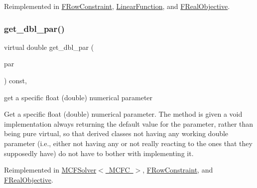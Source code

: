 Reimplemented in \mbox{\hyperlink{class_s_m_spp__di__unipi__it_1_1_f_row_constraint_af420d3dff49afbccc8a0c2de86374eeb}{F\+Row\+Constraint}}, \mbox{\hyperlink{class_s_m_spp__di__unipi__it_1_1_linear_function_a8c965c848816d9acca40c995164e5773}{Linear\+Function}}, and \mbox{\hyperlink{class_s_m_spp__di__unipi__it_1_1_f_real_objective_af420d3dff49afbccc8a0c2de86374eeb}{F\+Real\+Objective}}.

\mbox{\label{class_s_m_spp__di__unipi__it_1_1_thin_compute_interface_a16a600de08446b386bc437d8448ef44a}} 
\subsubsection{\texorpdfstring{get\+\_\+dbl\+\_\+par()}{get\_dbl\_par()}}
{\footnotesize\ttfamily virtual double get\+\_\+dbl\+\_\+par (\begin{DoxyParamCaption}\item[{const \mbox{\hyperlink{class_s_m_spp__di__unipi__it_1_1_thin_compute_interface_aa3d710629ad8c434286726ad810c3b47}{idx\+\_\+type}}}]{par }\end{DoxyParamCaption}) const\hspace{0.3cm}{\ttfamily [inline]}, {\ttfamily [virtual]}}



get a specific float (double) numerical parameter 

Get a specific float (double) numerical parameter. The method is given a void implementation always returning the default value for the parameter, rather than being pure virtual, so that derived classes not having any working double parameter (i.\+e., either not having any or not really reacting to the ones that they supposedly have) do not have to bother with implementing it. 

Reimplemented in \mbox{\hyperlink{class_s_m_spp__di__unipi__it_1_1_m_c_f_solver_af7101b9f3e872b6ad9129ab99cff4cb7}{M\+C\+F\+Solver$<$ M\+C\+F\+C $>$}}, \mbox{\hyperlink{class_s_m_spp__di__unipi__it_1_1_f_row_constraint_af7101b9f3e872b6ad9129ab99cff4cb7}{F\+Row\+Constraint}}, and \mbox{\hyperlink{class_s_m_spp__di__unipi__it_1_1_f_real_objective_af7101b9f3e872b6ad9129ab99cff4cb7}{F\+Real\+Objective}}.

